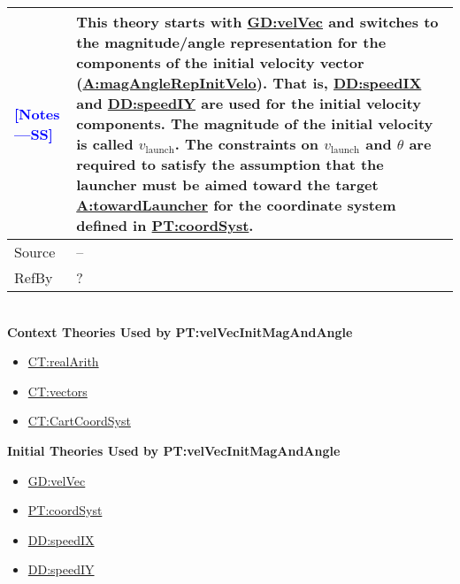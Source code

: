 \documentclass[12pt]{article}
\newcommand{\authornote}[3]{\textcolor{#1}{[#3 ---#2]}}
\newcommand{\authornote}[3]{}
\newcommand{\wss}[1]{\authornote{blue}{SS}{#1}}
\begin{document}
\begin{minipage}{\textwidth}
\begin{tabular}{>{\raggedright}p{}>{\raggedright\arraybackslash}p{}}
\\ \midrule \wss{Notes} & This theory starts with
\hyperref[GD:velVec]{GD:velVec} and switches to the magnitude/angle
representation for the components of the initial velocity vector
(\hyperref[magAngleRepInitVelo]{A:magAngleRepInitVelo}).  That is,
\hyperref[DD:speedIX]{DD:speedIX} and \hyperref[DD:speedIY]{DD:speedIY} are used
for the initial velocity components. The magnitude of the initial velocity is
called $v_\text{launch}$.  The constraints on $v_\text{launch}$ and $\theta$ are
required to satisfy the assumption that the launcher must be aimed toward the
target \hyperref[towardLauncher]{A:towardLauncher} for the coordinate system
defined in \hyperref[PT:coordSyst]{PT:coordSyst}.

\\ \midrule
Source & --
         
\\ \midrule
RefBy & ?

\\ \bottomrule
\end{tabular}
\end{minipage}
~\\

\noindent \textbf{Context Theories Used by PT:velVecInitMagAndAngle}

\begin{itemize}
\item \hyperref[CT:realArith]{CT:realArith}
\item \hyperref[CT:vectors]{CT:vectors}
\item \hyperref[CT:CartCoordSyst]{CT:CartCoordSyst}
\end{itemize}

\noindent \textbf{Initial Theories Used by PT:velVecInitMagAndAngle}

\begin{itemize}
\item \hyperref[GD:velVec]{GD:velVec}
\item \hyperref[PT:coordSyst]{PT:coordSyst}
\item \hyperref[DD:speedIX]{DD:speedIX}
\item \hyperref[DD:speedIY]{DD:speedIY}
\end{itemize}
\end{document}
